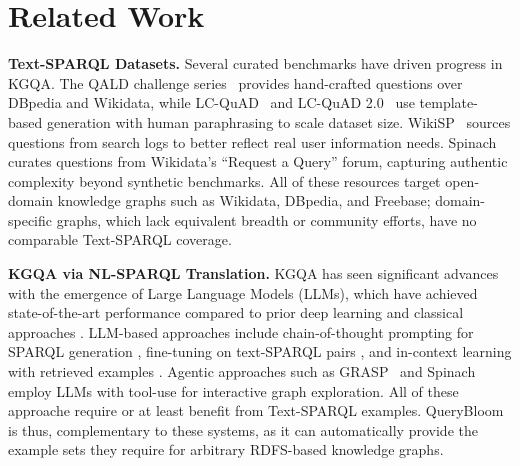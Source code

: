 \section{Related Work}
\label{sec:related}


\textbf{Text-SPARQL Datasets.} Several curated benchmarks have driven progress in KGQA. The QALD challenge series~\cite{usbeck2019qald,usbeck2021qald} provides hand-crafted questions over DBpedia and Wikidata, while LC-QuAD~\cite{trivedi2017lc} and LC-QuAD 2.0~\cite{dubey2019lcquad} use template-based generation with human paraphrasing to scale dataset size. WikiSP~\cite{wikisp2023} sources questions from search logs to better reflect real user information needs. Spinach~\cite{liu2024spinach} curates questions from Wikidata's ``Request a Query'' forum, capturing authentic complexity beyond synthetic benchmarks. All of these resources target open-domain knowledge graphs such as Wikidata, DBpedia, and Freebase; domain-specific graphs, which lack equivalent breadth or community efforts, have no comparable Text-SPARQL coverage. 

\textbf{KGQA via NL-SPARQL Translation.} KGQA has seen significant advances with the emergence of Large Language Models (LLMs), which have achieved state-of-the-art performance compared to prior deep learning and classical approaches \cite{dabramo-etal-2025-investigating,sgpt2022generative}. LLM-based approaches include chain-of-thought prompting for SPARQL generation \cite{zahera2024generating}, fine-tuning on text-SPARQL pairs \cite{sgpt2022generative,neural2022machine}, and in-context learning with retrieved examples \cite{emonet2024llm}. Agentic approaches such as GRASP~\cite{walter2025grasp} and Spinach~\cite{liu2024spinach} employ LLMs with tool-use for interactive graph exploration. All of these approache require or at least benefit from Text-SPARQL examples. QueryBloom is thus, complementary to these systems, as it can automatically provide the example sets they require for arbitrary RDFS-based knowledge graphs.

